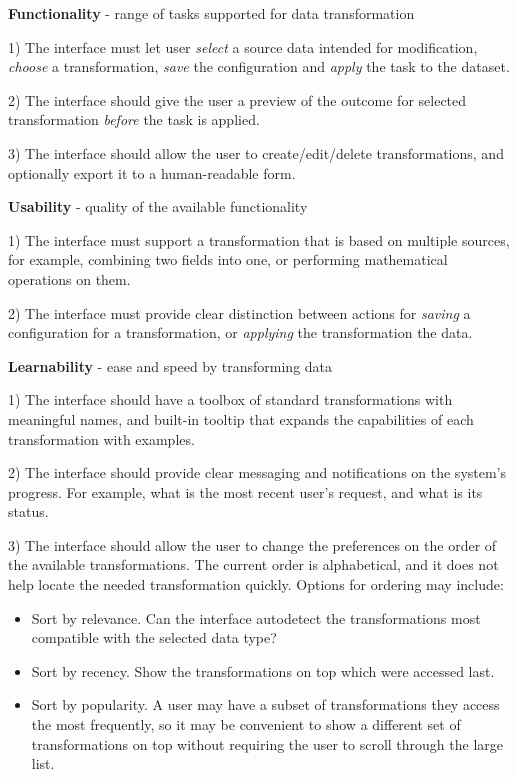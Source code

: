 \documentclass[12pt,letterpaper]{article}
\begin{document}
\textbf{Functionality} - range of tasks supported for data transformation

1) The interface must let user \textit{select} a source data intended for modification, \textit{choose} a transformation, \textit{save} the configuration and \textit{apply} the task to the dataset.

2) The interface should give the user a preview of the outcome for selected transformation \textit{before} the task is applied.

3) The interface should allow the user to create/edit/delete transformations, and optionally export it to a human-readable form.

\textbf{Usability} - quality of the available functionality

1) The interface must support a transformation that is based on multiple sources, for example, combining two fields into one, or performing mathematical operations on them.

2) The interface must provide clear distinction between actions for \textit{saving} a configuration for a transformation, or \textit{applying} the transformation the data.

\textbf{Learnability} - ease and speed by transforming data

1) The interface should have a toolbox of standard transformations with meaningful names, and built-in tooltip that expands the capabilities of each transformation with examples.

2) The interface should provide clear messaging and notifications on the system's progress. For example, what is the most recent user's request, and what is its status.

3) The interface should allow the user to change the preferences on the order of the available transformations. The current order is alphabetical, and it does not help locate the needed transformation quickly. Options for ordering may include: 

\begin{itemize}
    \item Sort by relevance. Can the interface autodetect the transformations most compatible with the selected data type?
    \item Sort by recency. Show the transformations on top which were accessed last.
    \item Sort by popularity. A user may have a subset of transformations they access the most frequently, so it may be convenient to show a different set of transformations on top without requiring the user to scroll through the large list. 
\end{itemize}
\end{document}
